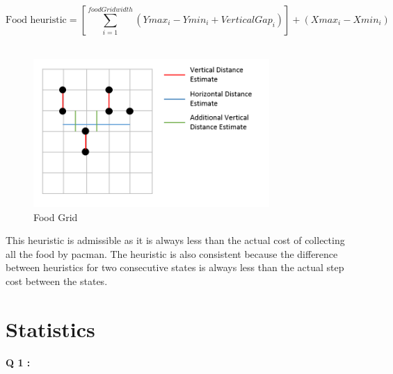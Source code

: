 \documentclass[11pt]{article}
\begin{document}
$$ \text{Food heuristic}=  [\sum_{i=1}^{foodGridwidth}  (Ymax_i  - Ymin_i +VerticalGap_i )]     + (Xmax_i   - Xmin_i)  $$ \\ 
\begin{figure}[h!]
 
  \centering
    \includegraphics[width=0.8\textwidth]{image.png}
     \caption{Food Grid}
\end{figure}

This heuristic is admissible as it is always  less than the actual cost of collecting all the food by pacman. The heuristic is also consistent because the difference between heuristics for two consecutive states is always less than the actual step cost  between the states.\\

\section{Statistics}

{\bf Q 1 :}
\bgroup\obeylines
\end{document}
